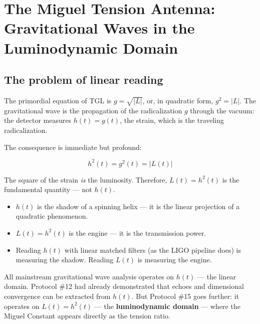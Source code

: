 \documentclass[12pt,a4paper,twoside]{article}
\begin{document}

\section{The Miguel Tension Antenna: Gravitational Waves in the Luminodynamic Domain}
\label{sec:antena}

\subsection{The problem of linear reading}

The primordial equation of TGL is $g = \sqrt{|L|}$, or, in quadratic form, $g^2 = |L|$. The gravitational wave is the propagation of the radicalization $g$ through the vacuum: the detector measures $h(t) = g(t)$, the strain, which is the traveling radicalization.

The consequence is immediate but profound:
%
\begin{equationbox}[title={The luminodynamic domain}]
\begin{equation}
h^2(t) = g^2(t) = |L(t)|
\label{eq:luminodinamico}
\end{equation}
\end{equationbox}
%
The square of the strain \textit{is} the luminosity. Therefore, $L(t) = h^2(t)$ is the fundamental quantity --- not $h(t)$.

\begin{factorbox}[title={The analogy}]
\begin{itemize}[nosep]
\item $h(t)$ is the shadow of a spinning helix --- it is the linear projection of a quadratic phenomenon.
\item $L(t) = h^2(t)$ is the engine --- it is the transmission power.
\item Reading $h(t)$ with linear matched filters (as the LIGO pipeline does) is measuring the shadow. Reading $L(t)$ is measuring the engine.
\end{itemize}
\end{factorbox}

\noindent All mainstream gravitational wave analysis operates on $h(t)$ --- the linear domain. Protocol \#12 \cite{Miguel2026LastString} had already demonstrated that echoes and dimensional convergence can be extracted from $h(t)$. But Protocol \#15 goes further: it operates on $L(t) = h^2(t)$ --- the \textbf{luminodynamic domain} --- where the Miguel Constant appears directly as the tension ratio.
\end{document}
